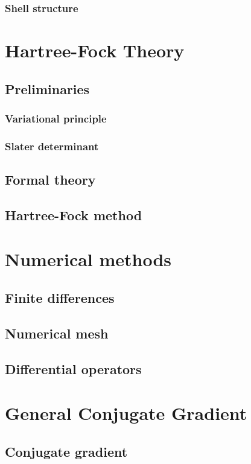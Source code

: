 \documentclass{book}
\begin{document}
\subsection{Shell structure}

\chapter{Hartree-Fock Theory}
\section{Preliminaries}
\subsection{Variational principle}
\subsection{Slater determinant}

\section{Formal theory}
\section{Hartree-Fock method}

\chapter{Numerical methods}
\section{Finite differences}
\section{Numerical mesh}
\section{Differential operators}

\chapter{General Conjugate Gradient}
\section{Conjugate gradient}
\end{document}
